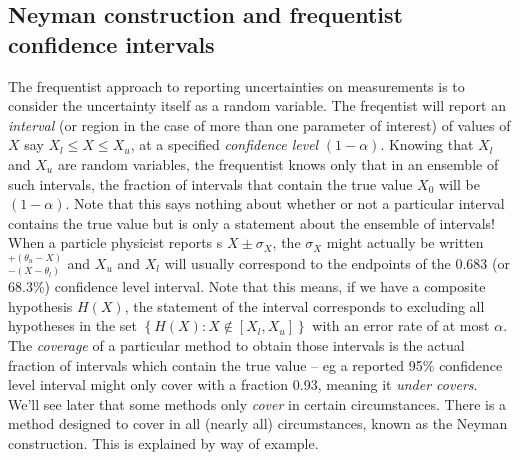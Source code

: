 \subsection{Neyman construction and frequentist confidence intervals}
The frequentist approach to reporting uncertainties on measurements is to consider the uncertainty itself as a random variable. The freqentist will report an \emph{interval} (or region in the case of more than one parameter of interest) of values of $X$ say $X_{l} \leq X \leq X_{u}$, at a specified \emph{confidence level} $(1-\alpha)$.  Knowing that $X_{l}$ and $X_u$ are random variables, the frequentist knows only that in an  ensemble of such intervals, the fraction of intervals that contain the true value $X_0$ will be $(1-\alpha)$. Note that this says nothing about whether or not a particular interval contains the true value but is only a statement about the ensemble of intervals! When a particle physicist reports s $X\pm\sigma_{X}$, the $\sigma_{X}$ might actually be written $^{+(\theta_{u}-X)}_{-(X-\theta_{l})}$ and $X_{u}$ and $X_{l}$ will usually correspond to the endpoints of the 0.683 (or 68.3\%) confidence level interval. Note that this means, if we have a composite hypothesis $H(X)$, the statement of the interval corresponds to excluding all hypotheses in the set $\left\{H(X) : X \not\in[X_{l},X_{u}]\right\}$ with an error rate of at most $\alpha$. The \emph{coverage} of a particular method to obtain those intervals is the actual fraction of intervals which contain the true value -- eg a reported 95\% confidence level interval might only cover with a fraction 0.93, meaning it \emph{under covers}. We'll see later that some methods only \emph{cover} in certain circumstances. There is a method designed to cover in all (nearly all) circumstances, known as the Neyman construction. This is explained by way of example.

